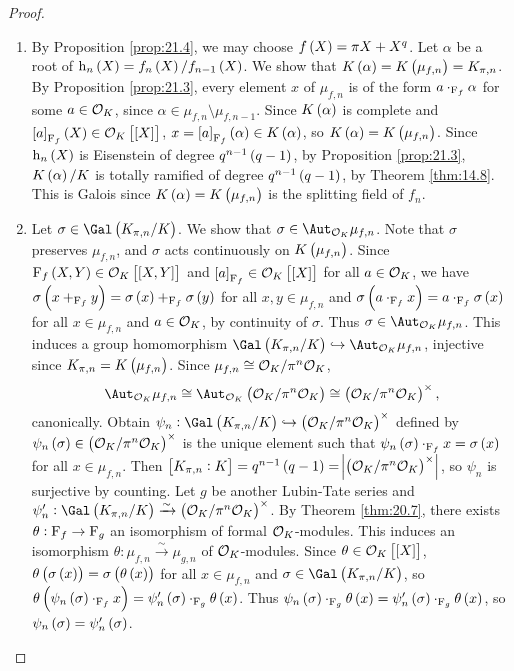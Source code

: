 \begin{proof}
\hfill
\begin{enumerate}
\item By Proposition \ref{prop:21.4}, we may choose $ f\br{X} = \pi X + X^q $. Let $ \alpha $ be a root of $ \h_n\br{X} = f_n\br{X} / f_{n - 1}\br{X} $. We show that $ K\br{\alpha} = K\br{\mu_{f, n}} = K_{\pi, n} $. By Proposition \ref{prop:21.3}, every element $ x $ of $ \mu_{f, n} $ is of the form $ a \cdot_{\mathrm{F}_f} \alpha $ for some $ a \in \mathcal{O}_K $, since $ \alpha \in \mu_{f, n} \setminus \mu_{f, n - 1} $. Since $ K\br{\alpha} $ is complete and $ \sbr{a}_{\F_f}\br{X} \in \OOO_K\sbr{\sbr{X}} $, $ x = \sbr{a}_{\F_f}\br{\alpha} \in K\br{\alpha} $, so $ K\br{\alpha} = K\br{\mu_{f, n}} $. Since $ \h_n\br{X} $ is Eisenstein of degree $ q^{n - 1}\br{q - 1} $, by Proposition \ref{prop:21.3}, $ K\br{\alpha} / K $ is totally ramified of degree $ q^{n - 1}\br{q - 1} $, by Theorem \ref{thm:14.8}. This is Galois since $ K\br{\alpha} = K\br{\mu_{f, n}} $ is the splitting field of $ f_n $.
\item Let $ \sigma \in \Gal\br{K_{\pi, n} / K} $. We show that $ \sigma \in \Aut_{\OOO_K} \mu_{f, n} $. Note that $ \sigma $ preserves $ \mu_{f, n} $, and $ \sigma $ acts continuously on $ K\br{\mu_{f, n}} $. Since $ \F_f\br{X, Y} \in \OOO_K\sbr{\sbr{X, Y}} $ and $ \sbr{a}_{\F_f} \in \OOO_K\sbr{\sbr{X}} $ for all $ a \in \mathcal{O}_K $, we have $ \sigma\br{x +_{\F_f} y} = \sigma\br{x} +_{\F_f} \sigma\br{y} $ for all $ x, y \in \mu_{f, n} $ and $ \sigma\br{a \cdot_{\F_f} x} = a \cdot_{\F_f} \sigma\br{x} $ for all $ x \in \mu_{f, n} $ and $ a \in \mathcal{O}_K $, by continuity of $ \sigma $. Thus $ \sigma \in \Aut_{\OOO_K} \mu_{f, n} $. This induces a group homomorphism $ \Gal\br{K_{\pi, n} / K} \hookrightarrow \Aut_{\OOO_K} \mu_{f, n} $, injective since $ K_{\pi, n} = K\br{\mu_{f, n}} $. Since $ \mu_{f, n} \cong \mathcal{O}_K / \pi^n\mathcal{O}_K $,
$$ \Aut_{\OOO_K} \mu_{f, n} \cong \Aut_{\OOO_K} \br{\OOO_K / \pi^n\OOO_K} \cong \br{\OOO_K / \pi^n\OOO_K}^\times, $$
canonically. Obtain $ \psi_n : \Gal\br{K_{\pi, n} / K} \hookrightarrow \br{\OOO_K / \pi^n\OOO_K}^\times $ defined by $ \psi_n\br{\sigma} \in \br{\OOO_K / \pi^n\OOO_K}^\times $ is the unique element such that $ \psi_n\br{\sigma} \cdot_{\F_f} x = \sigma\br{x} $ for all $ x \in \mu_{f, n} $. Then $ \sbr{K_{\pi, n} : K} = q^{n - 1}\br{q - 1} = \abs{\br{\OOO_K / \pi^n\OOO_K}^\times} $, so $ \psi_n $ is surjective by counting. Let $ g $ be another Lubin-Tate series and $ \psi_n' : \Gal\br{K_{\pi, n} / K} \xrightarrow{\sim} \br{\OOO_K / \pi^n\OOO_K}^\times $. By Theorem \ref{thm:20.7}, there exists $ \theta : \mathrm{F}_f \to \mathrm{F}_g $ an isomorphism of formal $ \mathcal{O}_K $-modules. This induces an isomorphism $ \theta : \mu_{f, n} \xrightarrow{\sim} \mu_{g, n} $ of $ \mathcal{O}_K $-modules. Since $ \theta \in \OOO_K\sbr{\sbr{X}} $, $ \theta\br{\sigma\br{x}} = \sigma\br{\theta\br{x}} $ for all $ x \in \mu_{f, n} $ and $ \sigma \in \Gal\br{K_{\pi, n} / K} $, so $ \theta\br{\psi_n\br{\sigma} \cdot_{\F_f} x} = \psi_n'\br{\sigma} \cdot_{\F_g} \theta\br{x} $. Thus $ \psi_n\br{\sigma} \cdot_{\F_g} \theta\br{x} = \psi_n'\br{\sigma} \cdot_{\F_g} \theta\br{x} $, so $ \psi_n\br{\sigma} = \psi_n'\br{\sigma} $.
\end{enumerate}
\end{proof}

